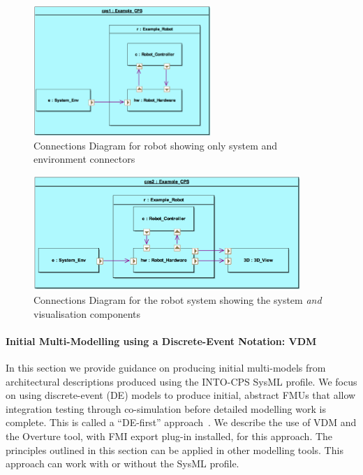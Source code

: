 \begin{figure}
\centering
\includegraphics[width=0.6\textwidth]{figures/E_Blocks_ext_cd}
\caption{Connections Diagram for robot showing only system and environment connectors}
\label{fig:example_cd}
\end{figure}

\begin{figure}
\centering
\includegraphics[width=0.9\textwidth]{figures/E_Blocks_ext_cd2}
\caption{Connections Diagram for the robot system showing the system \textit{and} visualisation components}
\label{fig:example_cd2}
\end{figure}



\paragraph{Initial Multi-Modelling using a Discrete-Event Notation: VDM}
\label{sec:method:defirst}

In this section we provide guidance on producing initial multi-models from architectural descriptions produced using the INTO-CPS SysML profile. We focus on using discrete-event (DE) models to produce initial, abstract FMUs that allow integration testing through co-simulation before detailed modelling work is complete. This is called a ``DE-first'' approach~\cite{Fitzgerald&13b,Fitzgerald&13a}. We describe the use of VDM and the Overture tool, with FMI export plug-in installed, for this approach. The principles outlined in this section can be applied in other modelling tools. This approach can work with or without the SysML profile.

